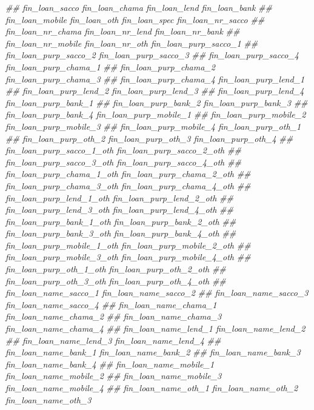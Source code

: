 \documentclass[
]{article}
\newenvironment{Shaded}{\begin{snugshade}}{\end{snugshade}}
\newcommand{\CommentTok}[1]{\textcolor[rgb]{0.56,0.35,0.01}{\textit{#1}}}
\begin{document}
\begin{Shaded}
\begin{Highlighting}[]
\CommentTok{##      fin_loan_sacco fin_loan_chama fin_loan_lend fin_loan_bank}
\CommentTok{##      fin_loan_mobile fin_loan_oth fin_loan_spec fin_loan_nr_sacco}
\CommentTok{##      fin_loan_nr_chama fin_loan_nr_lend fin_loan_nr_bank}
\CommentTok{##      fin_loan_nr_mobile fin_loan_nr_oth fin_loan_purp_sacco_1}
\CommentTok{##      fin_loan_purp_sacco_2 fin_loan_purp_sacco_3}
\CommentTok{##      fin_loan_purp_sacco_4 fin_loan_purp_chama_1}
\CommentTok{##      fin_loan_purp_chama_2 fin_loan_purp_chama_3}
\CommentTok{##      fin_loan_purp_chama_4 fin_loan_purp_lend_1}
\CommentTok{##      fin_loan_purp_lend_2 fin_loan_purp_lend_3}
\CommentTok{##      fin_loan_purp_lend_4 fin_loan_purp_bank_1}
\CommentTok{##      fin_loan_purp_bank_2 fin_loan_purp_bank_3}
\CommentTok{##      fin_loan_purp_bank_4 fin_loan_purp_mobile_1}
\CommentTok{##      fin_loan_purp_mobile_2 fin_loan_purp_mobile_3}
\CommentTok{##      fin_loan_purp_mobile_4 fin_loan_purp_oth_1}
\CommentTok{##      fin_loan_purp_oth_2 fin_loan_purp_oth_3 fin_loan_purp_oth_4}
\CommentTok{##      fin_loan_purp_sacco_1_oth fin_loan_purp_sacco_2_oth}
\CommentTok{##      fin_loan_purp_sacco_3_oth fin_loan_purp_sacco_4_oth}
\CommentTok{##      fin_loan_purp_chama_1_oth fin_loan_purp_chama_2_oth}
\CommentTok{##      fin_loan_purp_chama_3_oth fin_loan_purp_chama_4_oth}
\CommentTok{##      fin_loan_purp_lend_1_oth fin_loan_purp_lend_2_oth}
\CommentTok{##      fin_loan_purp_lend_3_oth fin_loan_purp_lend_4_oth}
\CommentTok{##      fin_loan_purp_bank_1_oth fin_loan_purp_bank_2_oth}
\CommentTok{##      fin_loan_purp_bank_3_oth fin_loan_purp_bank_4_oth}
\CommentTok{##      fin_loan_purp_mobile_1_oth fin_loan_purp_mobile_2_oth}
\CommentTok{##      fin_loan_purp_mobile_3_oth fin_loan_purp_mobile_4_oth}
\CommentTok{##      fin_loan_purp_oth_1_oth fin_loan_purp_oth_2_oth}
\CommentTok{##      fin_loan_purp_oth_3_oth fin_loan_purp_oth_4_oth}
\CommentTok{##      fin_loan_name_sacco_1 fin_loan_name_sacco_2}
\CommentTok{##      fin_loan_name_sacco_3 fin_loan_name_sacco_4}
\CommentTok{##      fin_loan_name_chama_1 fin_loan_name_chama_2}
\CommentTok{##      fin_loan_name_chama_3 fin_loan_name_chama_4}
\CommentTok{##      fin_loan_name_lend_1 fin_loan_name_lend_2}
\CommentTok{##      fin_loan_name_lend_3 fin_loan_name_lend_4}
\CommentTok{##      fin_loan_name_bank_1 fin_loan_name_bank_2}
\CommentTok{##      fin_loan_name_bank_3 fin_loan_name_bank_4}
\CommentTok{##      fin_loan_name_mobile_1 fin_loan_name_mobile_2}
\CommentTok{##      fin_loan_name_mobile_3 fin_loan_name_mobile_4}
\CommentTok{##      fin_loan_name_oth_1 fin_loan_name_oth_2 fin_loan_name_oth_3}

\end{Highlighting}
\end{Shaded}
\end{document}
